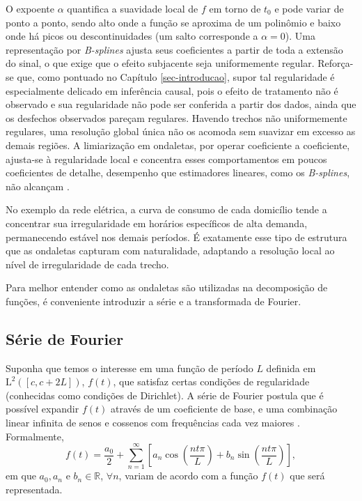 O expoente \(\alpha\) quantifica a suavidade local de \(f\) em torno de \(t_0\) e pode variar de ponto a ponto, sendo alto onde a função se aproxima de um polinômio e baixo onde há picos ou descontinuidades (um salto corresponde a \(\alpha = 0\)).
Uma representação por \emph{B-splines} ajusta seus coeficientes a partir de toda a extensão do sinal, o que exige que o efeito subjacente seja uniformemente regular.
Reforça-se que, como pontuado no Capítulo \ref{sec-introducao}, supor tal regularidade é especialmente delicado em inferência causal, pois o efeito de tratamento não é observado e sua regularidade não pode ser conferida a partir dos dados, ainda que os desfechos observados pareçam regulares.
Havendo trechos não uniformemente regulares, uma resolução global única não os acomoda sem suavizar em excesso as demais regiões.
A limiarização em ondaletas, por operar coeficiente a coeficiente, ajusta-se à regularidade local e concentra esses comportamentos em poucos coeficientes de detalhe, desempenho que estimadores lineares, como os \emph{B-splines}, não alcançam \cite{donoho_ideal_1994}.

No exemplo da rede elétrica, a curva de consumo de cada domicílio tende a concentrar sua irregularidade em horários específicos de alta demanda, permanecendo estável nos demais períodos. É exatamente esse tipo de estrutura que as ondaletas capturam com naturalidade, adaptando a resolução local ao nível de irregularidade de cada trecho.

Para melhor entender como as ondaletas são utilizadas na decomposição de funções, é conveniente introduzir a série e a transformada de Fourier.

\subsection{Série de Fourier} \label{sec:fourier_series}
Suponha que temos o interesse em uma função de período \(L\) definida em \(\mathrm{L}^{2}([c, c + 2L])\), \(f(t)\), que satisfaz certas condições de regularidade (conhecidas como condições de Dirichlet). A série de Fourier postula que é possível expandir \(f(t)\) através de um coeficiente de base, e uma combinação linear infinita de senos e cossenos com frequências cada vez maiores \cite{guidorizzi_um_2013}. Formalmente, 
\begin{equation}
  f(t) = \frac{a_0}{2} + \sum\limits_{n = 1}^{\infty} \left[a_n \cos\left(\frac{nt\pi}{L}\right) + b_n \sin\left(\frac{nt\pi}{L}\right)\right],
  \label{eq:fourier_serie_real}
\end{equation}
em que \(a_0, a_n\) e \(b_n \in \mathbb{R}\), \(\forall n\), variam de acordo com a função \(f(t)\) que será representada.


